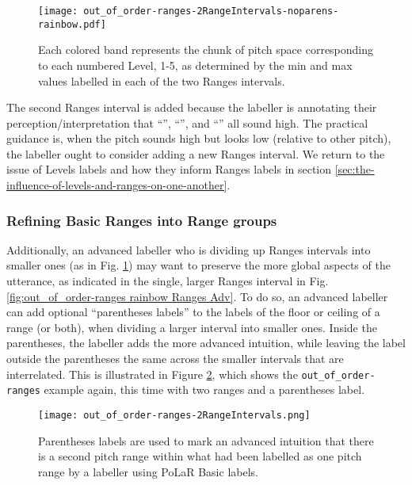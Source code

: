 \begin{figure}[H]
\centering
%
\texttt{[image: out\_of\_order-ranges-2RangeIntervals-noparens-rainbow.pdf]}
%
\caption[Each colored band represents the chunk of pitch space corresponding to each numbered Level, 1-5.]{Each colored band represents the chunk of pitch space corresponding to each numbered Level, 1-5, as determined by the min and max values labelled in each of the two Ranges intervals.%
\label{fig:out_of_order-ranges 2range no() Ranges Adv}%
}
\end{figure}

The second Ranges interval is added because the labeller is annotating their perception\slash interpretation that “”, “”, and “” all sound high.  The practical guidance is, when the pitch sounds high but looks low (relative to other pitch), the labeller ought to consider adding a new Ranges interval. We return to the issue of Levels labels and how they inform Ranges labels in section \ref{sec:the-influence-of-levels-and-ranges-on-one-another}.

\subsubsection*{Refining Basic Ranges into Range groups}
Additionally, an advanced labeller who is dividing up Ranges intervals into smaller ones (as in Fig. \ref{fig:out_of_order-ranges 2range no() Ranges Adv}) may want to preserve the more global aspects of the utterance, as indicated in the single, larger Ranges interval in Fig. \ref{fig:out_of_order-ranges rainbow Ranges Adv}. To do so, an advanced labeller can add optional “parentheses labels” to the labels of the floor or ceiling of a range (or both), when dividing a larger interval into smaller ones. Inside the parentheses, the labeller adds the more advanced intuition, while leaving the label outside the parentheses the same across the smaller intervals that are interrelated. This is illustrated in Figure \ref{fig:out_of_order-ranges 2range Ranges Adv}, which shows the \texttt{out\_of\_order-ranges} example again, this time with two ranges and a parentheses label.

\begin{figure}[H]
\centering
%
\texttt{[image: out\_of\_order-ranges-2RangeIntervals.png]}
%
\caption{Parentheses labels are used to mark an advanced intuition that there is a second pitch range within what had been labelled as one pitch range by a labeller using PoLaR Basic labels.%
\label{fig:out_of_order-ranges 2range Ranges Adv}%
}
\end{figure}

